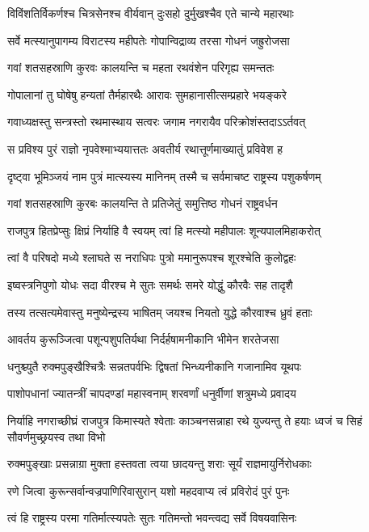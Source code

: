 \twolineshloka
{विविंशतिर्विकर्णश्च चित्रसेनश्च वीर्यवान्}
{दुःसहो दुर्मुखश्चैव एते चान्ये महारथाः}


\twolineshloka
{सर्वे मत्स्यानुपागम्य विराटस्य महीपतेः}
{गोपान्विद्राव्य तरसा गोधनं जह्रुरोजसा}


\twolineshloka
{गवां शतसहस्राणि कुरवः कालयन्ति च}
{महता रथवंशेन परिगृह्य समन्ततः}


\twolineshloka
{गोपालानां तु घोषेषु हन्यतां तैर्महारथैः}
{आरावः सुमहानासीत्सम्प्रहारे भयङ्करे}


\twolineshloka
{गवाध्यक्षस्तु सन्त्रस्तो रथमास्थाय सत्वरः}
{जगाम नगरायैव परिक्रोशंस्तदाऽऽर्तवत्}


\twolineshloka
{स प्रविश्य पुरं राज्ञो नृपवेश्माभ्ययात्ततः}
{अवतीर्य रथात्तूर्णमाख्यातुं प्रविवेश ह}


\twolineshloka
{दृष्ट्वा भूमिञ्जयं नाम पुत्रं मात्स्यस्य मानिनम्}
{तस्मै च सर्वमाचष्ट राष्ट्रस्य पशुकर्षणम्}


\twolineshloka
{गवां शतसहस्राणि कुरबः कालयन्ति ते}
{प्रतिजेतुं समुत्तिष्ठ गोधनं राष्ट्रवर्धन}


\twolineshloka
{राजपुत्र हितप्रेप्सुः क्षिप्रं निर्याहि वै स्वयम्}
{त्वां हि मत्स्यो महीपालः शून्यपालमिहाकरोत्}


\twolineshloka
{त्वां वै परिषदो मध्ये श्लाघते स नराधिपः}
{पुत्रो ममानुरूपश्च शूरश्चेति कुलोद्वहः}


\twolineshloka
{इष्वस्त्रनिपुणो योधः सदा वीरश्च मे सुतः}
{समर्थः समरे योद्धुं कौरवैः सह तादृशै}


\twolineshloka
{तस्य तत्सत्यमेवास्तु मनुष्येन्द्रस्य भाषितम्}
{जयश्च नियतो युद्धे कौरवाश्च ध्रुवं हताः}


\twolineshloka
{आवर्तय कुरूञ्जित्वा पशून्पशुपतिर्यथा}
{निर्दर्हषामनीकानि भीमेन शरतेजसा}


\twolineshloka
{धनुश्च्युतै रुक्मपुङ्खैश्चित्रैः सन्नतपर्वभिः}
{द्विषतां भिन्ध्यनीकानि गजानामिव यूथपः}


\twolineshloka
{पाशोपधानां ज्यातन्त्रीं चापदण्डां महास्वनाम्}
{शरवर्णां धनुर्वीणां शत्रुमध्ये प्रवादय}


\threelineshloka
{निर्याहि नगराच्छीघ्रं राजपुत्र किमास्यते}
{श्वेताः काञ्चनसन्नाहा रथे युज्यन्तु ते हयाः}
{ध्वजं च सिहं सौवर्णमुच्छ्रयस्व तथा विभो}


\twolineshloka
{रुक्मपुङ्खाः प्रसन्नाग्रा मुक्ता हस्तवता त्वया}
{छादयन्तु शराः सूर्यं राज्ञमायुर्निरोधकाः}


\twolineshloka
{रणे जित्वा कुरून्सर्वान्वज्रपाणिरिवासुरान्}
{यशो महदवाप्य त्वं प्रविरोदं पुरं पुनः}


\twolineshloka
{त्वं हि राष्ट्रस्य परमा गतिर्मात्स्यपतेः सुतः}
{गतिमन्तो भवन्त्वद्य सर्वे विषयवासिनः}


